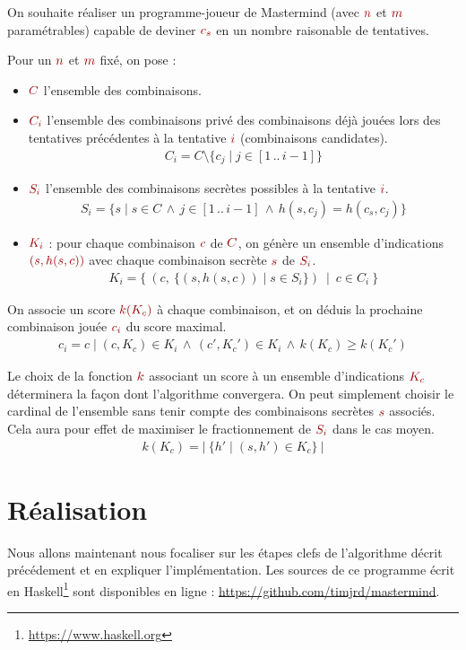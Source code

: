 \documentclass[a4paper]{article}
\newcommand{\isep}{\,..\,}
\renewcommand{\(}{\begin{math}\color{brick}}
\renewcommand{\)}{\end{math}}
\newcommand{\blockmath}[1]{{\color{brick}\begin{align*}#1\end{align*}}}
\newcommand{\nblockmath}[1]{{\color{brick}\begin{align}#1\end{align}}}
\newcommand{\lnd}{\,\land\,}
\begin{document}
On souhaite réaliser un programme-joueur de Mastermind (avec \(n\) et \(m\) paramétrables) capable de
deviner \(c_s\) en un nombre raisonable de tentatives.

Pour un \(n\) et \(m\) fixé, on pose :

\begin{itemize}
  
\item \(C\) l'ensemble des combinaisons.
\item \(C_i\) l'ensemble des combinaisons privé des combinaisons déjà jouées lors des tentatives précédentes à la tentative \(i\) (combinaisons candidates).
  \blockmath{
    C_i = C \setminus \{c_j \mid j \in [1 \isep i-1]\}
  }

\item \(S_i\) l'ensemble des combinaisons secrètes possibles à la tentative \(i\).
  \nblockmath{ \label{pred}
    S_i = \{s \mid s \in C \lnd j \in [1 \isep i-1] \lnd h(s,c_j) = h(c_s,c_j)\}
  }

\item \(K_i\) : pour chaque combinaison \(c\) de \(C\), on génère un ensemble d'indications \((s,h(s,c))\) avec chaque combinaison secrète \(s\) de \(S_i\).
  \nblockmath{ \label{prod}
    K_i = \{ \ (c, \ \{(s,h(s,c)) \mid s \in S_i\}) \ \mid \ c \in C_i \ \}
  }
  
\end{itemize}

On associe un score \(k(K_c)\) à chaque combinaison, et on déduis la prochaine combinaison jouée \(c_i\) du score maximal.
\blockmath{
  c_i = c \mid (c,K_c) \in K_i \lnd (c',K_c') \in K_i \lnd k(K_c) \geq k(K_c')
}

Le choix de la fonction \(k\) associant un score à un ensemble d'indications \(K_c\) déterminera la façon dont l'algorithme convergera. On peut simplement choisir le cardinal de l'ensemble sans tenir compte des combinaisons secrètes \(s\) associés. Cela aura pour effet de maximiser le fractionnement de \(S_i\) dans le cas moyen.
\blockmath{
  k(K_c) = | \ \{ h' \mid (s,h') \in K_c\} \ |
}


\section{Réalisation}

Nous allons maintenant nous focaliser sur les étapes clefs de l'algorithme décrit précédement et en expliquer l'implémentation. Les sources de ce programme écrit en Haskell\footnote{\url{https://www.haskell.org}} sont disponibles en ligne : \url{https://github.com/timjrd/mastermind}.
\end{document}
